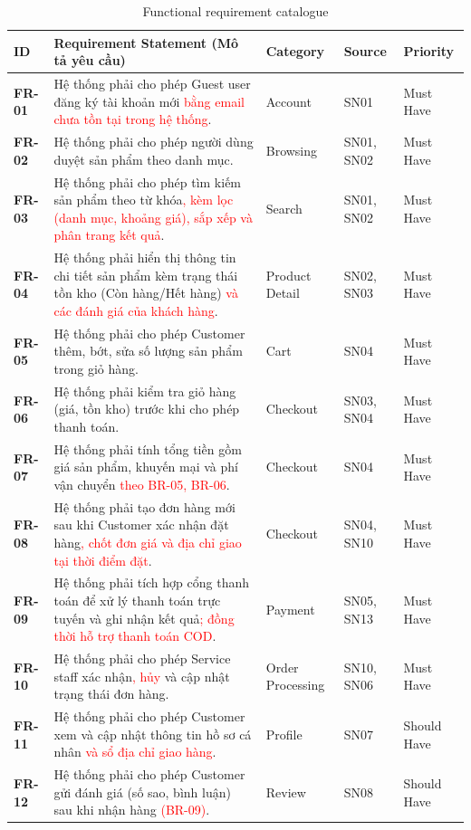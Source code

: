 \documentclass[12pt,a4paper,oneside]{report}
\newif\ifmark \marktrue
\newcommand{\chg}[1]{\ifmark\textcolor{red}{#1}\else #1\fi}
\begin{document}
\begin{longtable}{p{1.6cm}p{7.4cm}p{2.9cm}p{1.9cm}p{2.2cm}}
\caption{Functional requirement catalogue}\\
\toprule
\textbf{ID} & \textbf{Requirement Statement (Mô tả yêu cầu)} & \textbf{Category} & \textbf{Source} & \textbf{Priority} \\
\midrule
\endhead
\bottomrule
\endlastfoot
\textbf{FR-01} & Hệ thống phải cho phép Guest user đăng ký tài khoản mới\chg{ bằng email chưa tồn tại trong hệ thống}. & Account & SN01 & Must Have \\
\textbf{FR-02} & Hệ thống phải cho phép người dùng duyệt sản phẩm theo danh mục. & Browsing & SN01, SN02 & Must Have \\
\textbf{FR-03} & Hệ thống phải cho phép tìm kiếm sản phẩm theo từ khóa\chg{, kèm lọc (danh mục, khoảng giá), sắp xếp và phân trang kết quả}. & Search & SN01, SN02 & Must Have \\
\textbf{FR-04} & Hệ thống phải hiển thị thông tin chi tiết sản phẩm kèm trạng thái tồn kho (Còn hàng/Hết hàng)\chg{ và các đánh giá của khách hàng}. & Product Detail & SN02, SN03 & Must Have \\
\textbf{FR-05} & Hệ thống phải cho phép Customer thêm, bớt, sửa số lượng sản phẩm trong giỏ hàng. & Cart & SN04 & Must Have \\
\textbf{FR-06} & Hệ thống phải kiểm tra giỏ hàng (giá, tồn kho) trước khi cho phép thanh toán. & Checkout & SN03, SN04 & Must Have \\
\textbf{FR-07} & Hệ thống phải tính tổng tiền gồm giá sản phẩm, khuyến mại và phí vận chuyển\chg{ theo BR-05, BR-06}. & Checkout & SN04 & Must Have \\
\textbf{FR-08} & Hệ thống phải tạo đơn hàng mới sau khi Customer xác nhận đặt hàng\chg{, chốt đơn giá và địa chỉ giao tại thời điểm đặt}. & Checkout & SN04, SN10 & Must Have \\
\textbf{FR-09} & Hệ thống phải tích hợp cổng thanh toán để xử lý thanh toán trực tuyến và ghi nhận kết quả\chg{; đồng thời hỗ trợ thanh toán COD}. & Payment & SN05, SN13 & Must Have \\
\textbf{FR-10} & Hệ thống phải cho phép Service staff xác nhận\chg{, hủy} và cập nhật trạng thái đơn hàng. & Order Processing & SN10, SN06 & Must Have \\
\textbf{FR-11} & Hệ thống phải cho phép Customer xem và cập nhật thông tin hồ sơ cá nhân\chg{ và sổ địa chỉ giao hàng}. & Profile & SN07 & Should Have \\
\textbf{FR-12} & Hệ thống phải cho phép Customer gửi đánh giá (số sao, bình luận) sau khi nhận hàng\chg{ (BR-09)}. & Review & SN08 & Should Have \\

\end{longtable}
\end{document}
